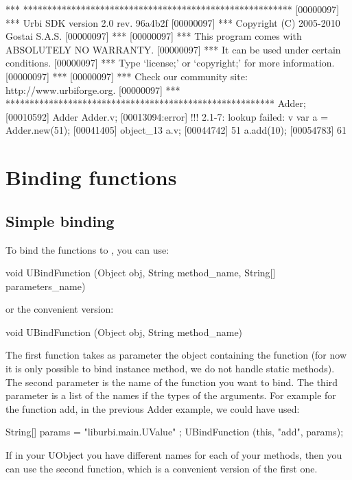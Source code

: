 \begin{cxx}
[00000097] *** ********************************************************
[00000097] *** Urbi SDK version 2.0 rev. 96a4b2f
[00000097] *** Copyright (C) 2005-2010 Gostai S.A.S.
[00000097] ***
[00000097] *** This program comes with ABSOLUTELY NO WARRANTY.
[00000097] *** It can be used under certain conditions.
[00000097] *** Type `license;' or `copyright;' for more information.
[00000097] ***
[00000097] *** Check our community site: http://www.urbiforge.org.
[00000097] *** ********************************************************
Adder;
[00010592] Adder
Adder.v;
[00013094:error] !!! 2.1-7: lookup failed: v
var a = Adder.new(51);
[00041405] object_13
a.v;
[00044742] 51
a.add(10);
[00054783] 61
\end{cxx}


\section{Binding functions}
\label{sec:uob:apijava:func}

\subsection{Simple binding}

To bind the functions to \urbi, you can use:
\begin{cxx}
void UBindFunction (Object obj, String method_name, String[] parameters_name)
\end{cxx}
or the convenient version:
\begin{cxx}
void UBindFunction (Object obj, String method_name)
\end{cxx}

The first function takes as parameter the object containing the function
(for now it is only possible to bind instance method, we do not handle static
methods). The second parameter is the name of the function you want to bind.
The third parameter is a list of the names if the types of the arguments.
For example for the function add, in the previous Adder example, we could have
used:

\begin{cxx}
String[] params = { "liburbi.main.UValue" };
UBindFunction (this, "add", params);
\end{cxx}

If in your UObject you have different names for each of your methods, then
you can use the second function, which is a convenient version of the first
one.

